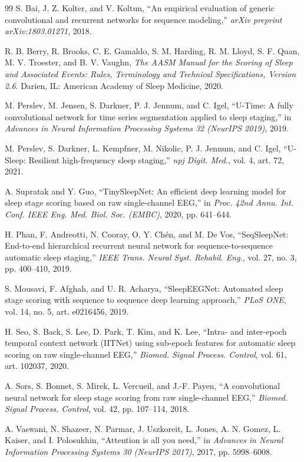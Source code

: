 \documentclass[conference]{IEEEtran}
\begin{document}
\begin{thebibliography}{99}
 S. Bai, J. Z. Kolter, and V. Koltun, ``An empirical evaluation of generic convolutional and
recurrent networks for sequence modeling,'' \emph{arXiv preprint arXiv:1803.01271}, 2018.

 R. B. Berry, R. Brooks, C. E. Gamaldo, S. M. Harding, R. M. Lloyd, S. F. Quan, M. V. Troester, and
B. V. Vaughn, \emph{The AASM Manual for the Scoring of Sleep and Associated Events: Rules, Terminology and
Technical Specifications, Version 2.6}. Darien, IL: American Academy of Sleep Medicine, 2020.

 M. Perslev, M. Jensen, S. Darkner, P. J. Jennum, and C. Igel, ``U-Time: A fully convolutional
network for time series segmentation applied to sleep staging,'' in \emph{Advances in Neural Information
Processing Systems 32 (NeurIPS 2019)}, 2019.

 M. Perslev, S. Darkner, L. Kempfner, M. Nikolic, P. J. Jennum, and C. Igel, ``U-Sleep: Resilient
high-frequency sleep staging,'' \emph{npj Digit. Med.}, vol. 4, art. 72, 2021.

 A. Supratak and Y. Guo, ``TinySleepNet: An efficient deep learning model for sleep stage
scoring based on raw single-channel EEG,'' in \emph{Proc. 42nd Annu. Int. Conf. IEEE Eng. Med. Biol. Soc. (EMBC)},
2020, pp. 641--644.

 H. Phan, F. Andreotti, N. Cooray, O. Y. Ch\'en, and M. De Vos, ``SeqSleepNet: End-to-end
hierarchical recurrent neural network for sequence-to-sequence automatic sleep staging,'' \emph{IEEE Trans. Neural
Syst. Rehabil. Eng.}, vol. 27, no. 3, pp. 400--410, 2019.

 S. Mousavi, F. Afghah, and U. R. Acharya, ``SleepEEGNet: Automated sleep stage scoring with
sequence to sequence deep learning approach,'' \emph{PLoS ONE}, vol. 14, no. 5, art. e0216456, 2019.

 H. Seo, S. Back, S. Lee, D. Park, T. Kim, and K. Lee, ``Intra- and inter-epoch temporal context
network (IITNet) using sub-epoch features for automatic sleep scoring on raw single-channel EEG,'' \emph{Biomed.
Signal Process. Control}, vol. 61, art. 102037, 2020.

 A. Sors, S. Bonnet, S. Mirek, L. Vercueil, and J.-F. Payen, ``A convolutional neural network for
sleep stage scoring from raw single-channel EEG,'' \emph{Biomed. Signal Process. Control}, vol. 42, pp. 107--114,
2018.

 A. Vaswani, N. Shazeer, N. Parmar, J. Uszkoreit, L. Jones, A. N. Gomez, L. Kaiser, and
I. Polosukhin, ``Attention is all you need,'' in \emph{Advances in Neural Information Processing Systems 30
(NeurIPS 2017)}, 2017, pp. 5998--6008.


\end{thebibliography}
\end{document}
